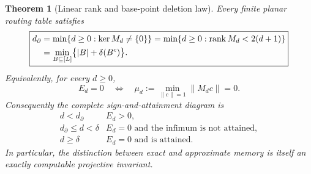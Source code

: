 \documentclass[11pt]{article}
\newtheorem{theorem}{Theorem}[section]
\theoremstyle{definition}\newtheorem{definition}[theorem]{Definition}\newtheorem{example}[theorem]{Example}
\theoremstyle{remark}\newtheorem{remark}[theorem]{Remark}\newtheorem{limitation}[theorem]{Limitation}
\newcommand{\norm}[1]{\lVert#1\rVert}\newcommand{\dd}{\,\mathrm d}
\begin{document}
\begin{theorem}[Linear rank and base-point deletion law]\label{thm:border}
Every finite planar routing table satisfies
\begin{equation}\label{eq:border}
 \boxed{\displaystyle
 \begin{aligned}
 d_\partial
 &=\min\{d\ge0:\ker M_d\ne\{0\}\}
  =\min\{d\ge0:\operatorname{rank} M_d<2(d+1)\}\\
 &=\min_{B\subseteq[L]}
                  \bigl\{|B|+\delta(B^c)\bigr\}.
 \end{aligned}}
\end{equation}
Equivalently, for every $d\ge0$,
\begin{equation}\label{eq:spectral-dichotomy}
 \boxed{E_d=0\quad\Longleftrightarrow\quad
        \mu_d:=\min_{\norm{c}=1}\norm{M_dc}=0.}
\end{equation}
Consequently the complete sign-and-attainment diagram is
\[
 \begin{array}{c|c}
 d<d_\partial&E_d>0,\\
 d_\partial\le d<\delta&E_d=0\text{ and the infimum is not attained},\\
 d\ge\delta&E_d=0\text{ and is attained}.
 \end{array}
\]
In particular, the distinction between exact and approximate memory is itself
an exactly computable projective invariant.
\end{theorem}
\end{document}
